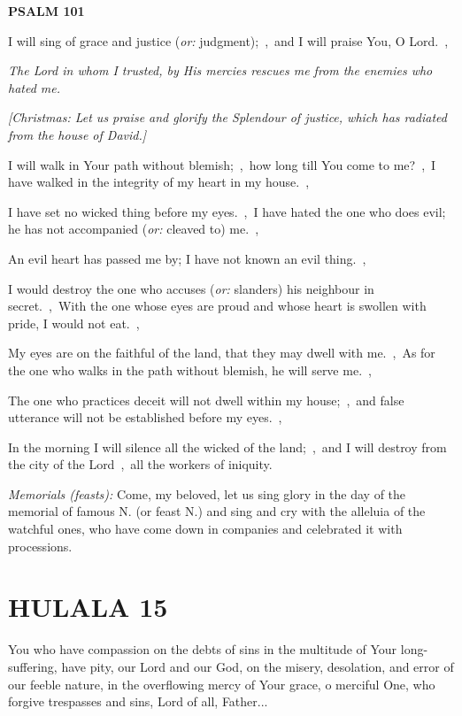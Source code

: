 \documentclass[12pt,twoside,a5paper]{article}
\newcommand{\hulala}[1]{\section*{HULALA {#1}}}
\newcommand{\psalm}[1]{\textbf{PSALM {#1}}\nopagebreak}
\newcommand{\qanona}[1]{{\liturgicalhint{Qanona.} \emph{#1}}}
\newcommand{\slota}[1]{\liturgicalhint{Slota.} #1}
\newcommand{\translationoption}[1]{\emph{or:} #1}
\begin{document}
\psalm{101}

\begin{normalparskip}
  I will sing of grace and justice (\translationoption{judgment});~\sep\ and I will praise You, O Lord.~\sep

  \qanona{The Lord in whom I trusted, by His mercies rescues me from the enemies who hated me.}

  \emph{[Christmas: Let us praise and glorify the Splendour of justice, which has radiated from the house of David.]}

  I will walk in Your path without blemish;~\sep\ how long till You come to me?~\sep\ I have walked in the integrity of my heart in my house.~\sep

  I have set no wicked thing before my eyes.~\sep\ I have hated the one who does evil; he has not accompanied (\translationoption{cleaved to}) me.~\sep

  An evil heart has passed me by; I have not known an evil thing.~\sep

  I would destroy the one who accuses (\translationoption{slanders}) his neighbour in secret.~\sep\ With the one whose eyes are proud and whose heart is swollen with pride, I would not eat.~\sep

  My eyes are on the faithful of the land, that they may dwell with me.~\sep\ As for the one who walks in the path without blemish, he will serve me.~\sep

  The one who practices deceit will not dwell within my house;~\sep\ and false utterance will not be established before my eyes.~\sep

  In the morning I will silence all the wicked of the land;~\sep\ and I will destroy from the city of the Lord~\sep\ all the workers of iniquity.

  \emph{Memorials (feasts):} Come, my beloved, let us sing glory in the day of the memorial of famous N. (or feast N.) and sing and cry with the alleluia of the watchful ones, who have come down in companies and celebrated it with processions.
\end{normalparskip}


\hulala{15}

\slota{You who have compassion on the debts of sins in the multitude of Your long-suffering, have pity, our Lord and our God, on the misery, desolation, and error of our feeble nature, in the overflowing mercy of Your grace, o merciful One, who forgive trespasses and sins, Lord of all, Father...}
\end{document}

